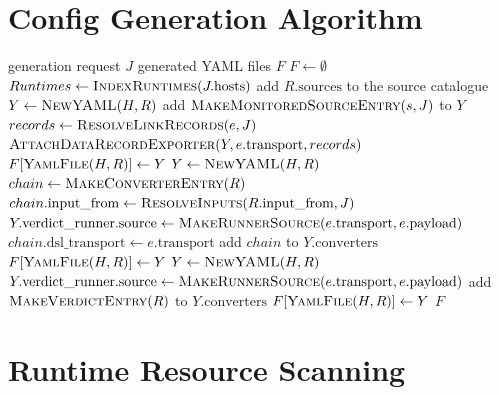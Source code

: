 \documentclass[11pt]{article}
\begin{document}
\clearpage
\section{Config Generation Algorithm}

\begin{algorithm}[H]
\caption{Generate runtime YAML from JSON}
\begin{algorithmic}[1]
\Require generation request $J$
\Ensure generated YAML files $F$
\State $F \gets \emptyset$
\State $Runtimes \gets \Call{IndexRuntimes}{J.\text{hosts}}$
      \State add $R.\text{sources}$ to the source catalogue
      \State $Y \gets \Call{NewYAML}{H,R}$
        \State add $\Call{MakeMonitoredSourceEntry}{s,J}$ to $Y$
      \EndFor
        \State $records \gets \Call{ResolveLinkRecords}{e,J}$
        \State $\Call{AttachDataRecordExporter}{Y,e.\text{transport},records}$
      \EndFor
      \State $F[\Call{YamlFile}{H,R}] \gets Y$
      \State $Y \gets \Call{NewYAML}{H,R}$
      \State $chain \gets \Call{MakeConverterEntry}{R}$
      \State $chain.\text{input\_from} \gets \Call{ResolveInputs}{R.\text{input\_from},J}$
        \State $Y.\text{verdict\_runner.source} \gets \Call{MakeRunnerSource}{e.\text{transport},e.\text{payload}}$
      \EndFor
        \State $chain.\text{dsl\_transport} \gets e.\text{transport}$
      \EndFor
      \State add $chain$ to $Y.\text{converters}$
      \State $F[\Call{YamlFile}{H,R}] \gets Y$
      \State $Y \gets \Call{NewYAML}{H,R}$
        \State $Y.\text{verdict\_runner.source} \gets \Call{MakeRunnerSource}{e.\text{transport},e.\text{payload}}$
      \EndFor
      \State add $\Call{MakeVerdictEntry}{R}$ to $Y.\text{converters}$
      \State $F[\Call{YamlFile}{H,R}] \gets Y$
    \EndIf
  \EndFor
\EndFor
\State {}
\State \Return $F$
\end{algorithmic}
\end{algorithm}

\section{Runtime Resource Scanning}
\end{document}
